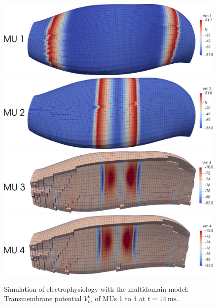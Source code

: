 \begin{figure}
  \centering%
  \includegraphics[width=\textwidth]{images/results/application/multidomain_4mus_mu1.png}\\[4mm]
  \includegraphics[width=\textwidth]{images/results/application/multidomain_4mus_mu2.png}\\[4mm]
  \includegraphics[width=\textwidth]{images/results/application/multidomain_4mus_mu3.png}\\[4mm]
  \includegraphics[width=\textwidth]{images/results/application/multidomain_4mus_mu4.png}%
  \caption{Simulation of electrophysiology with the multidomain model: Transmembrane potential $V_m^k$ of MUs 1 to 4 at $t=\SI{14}{\ms}$.}%
  \label{fig:multidomain_4mus}%
\end{figure}%

